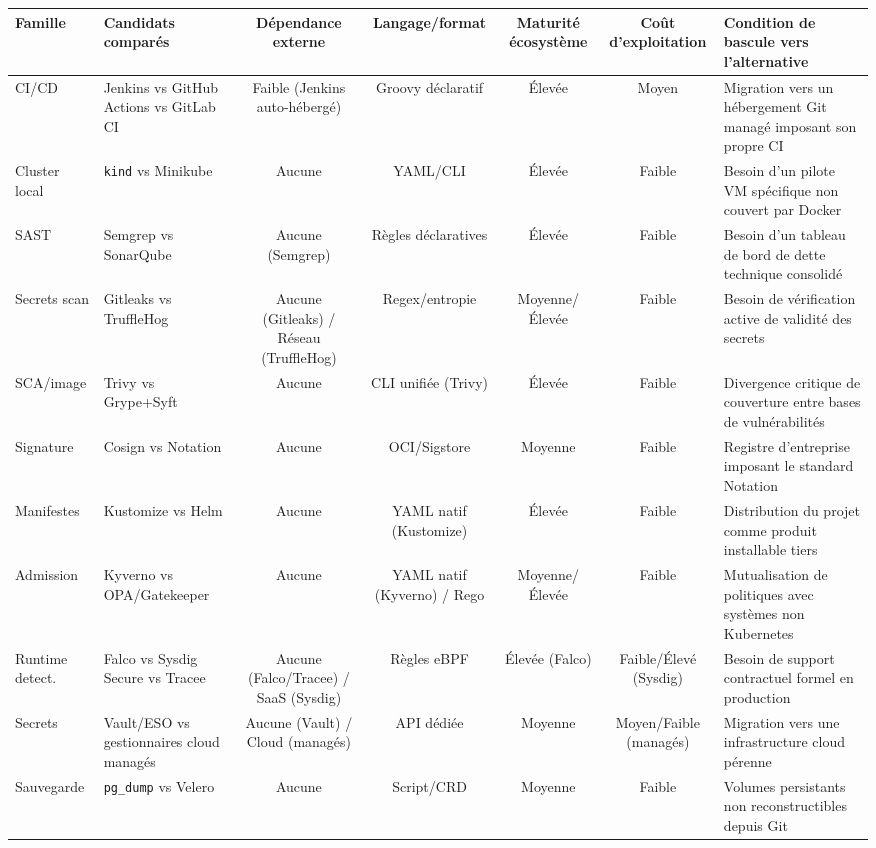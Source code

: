 \begin{table}[htbp]
\centering
\scriptsize
\begin{tabular}{@{}p{2.2cm}p{2.8cm}ccccp{3.8cm}@{}}
\toprule
\textbf{Famille} & \textbf{Candidats comparés} & \textbf{Dépendance externe} & \textbf{Langage/format} & \textbf{Maturité écosystème} & \textbf{Coût d'exploitation} & \textbf{Condition de bascule vers l'alternative} \\
\midrule
CI/CD & Jenkins vs GitHub Actions vs GitLab CI & Faible (Jenkins auto-hébergé) & Groovy déclaratif & Élevée & Moyen & Migration vers un hébergement Git managé imposant son propre CI \\
Cluster local & \texttt{kind} vs Minikube & Aucune & YAML/CLI & Élevée & Faible & Besoin d'un pilote VM spécifique non couvert par Docker \\
SAST & Semgrep vs SonarQube & Aucune (Semgrep) & Règles déclaratives & Élevée & Faible & Besoin d'un tableau de bord de dette technique consolidé \\
Secrets scan & Gitleaks vs TruffleHog & Aucune (Gitleaks) / Réseau (TruffleHog) & Regex/entropie & Moyenne/Élevée & Faible & Besoin de vérification active de validité des secrets \\
SCA/image & Trivy vs Grype+Syft & Aucune & CLI unifiée (Trivy) & Élevée & Faible & Divergence critique de couverture entre bases de vulnérabilités \\
Signature & Cosign vs Notation & Aucune & OCI/Sigstore & Moyenne & Faible & Registre d'entreprise imposant le standard Notation \\
Manifestes & Kustomize vs Helm & Aucune & YAML natif (Kustomize) & Élevée & Faible & Distribution du projet comme produit installable tiers \\
Admission & Kyverno vs OPA/Gatekeeper & Aucune & YAML natif (Kyverno) / Rego & Moyenne/Élevée & Faible & Mutualisation de politiques avec systèmes non Kubernetes \\
Runtime detect. & Falco vs Sysdig Secure vs Tracee & Aucune (Falco/Tracee) / SaaS (Sysdig) & Règles eBPF & Élevée (Falco) & Faible/Élevé (Sysdig) & Besoin de support contractuel formel en production \\
Secrets & Vault/ESO vs gestionnaires cloud managés & Aucune (Vault) / Cloud (managés) & API dédiée & Moyenne & Moyen/Faible (managés) & Migration vers une infrastructure cloud pérenne \\
Sauvegarde & \texttt{pg\_dump} vs Velero & Aucune & Script/CRD & Moyenne & Faible & Volumes persistants non reconstructibles depuis Git \\

\end{tabular}
\end{table}
